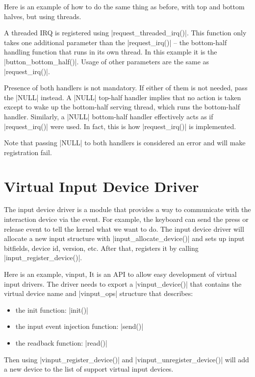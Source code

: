\documentclass[10pt, oneside]{book}
\begin{document}
Here is an example of how to do the same thing as before, with top and bottom halves, but using threads.


A threaded IRQ is registered using \cpp|request_threaded_irq()|.
This function only takes one additional parameter than the \cpp|request_irq()| -- the bottom-half handling function that runs in its own thread.
In this example it is the \cpp|button_bottom_half()|.
Usage of other parameters are the same as \cpp|request_irq()|.

Presence of both handlers is not mandatory.
If either of them is not needed, pass the \cpp|NULL| instead.
A \cpp|NULL| top-half handler implies that no action is taken except to wake up the bottom-half serving thread, which runs the bottom-half handler.
Similarly, a \cpp|NULL| bottom-half handler effectively acts as if \cpp|request_irq()| were used.
In fact, this is how \cpp|request_irq()| is implemented.

Note that passing \cpp|NULL| to both handlers is considered an error and will make registration fail.

\section{Virtual Input Device Driver}
\label{sec:vinput}
The input device driver is a module that provides a way to communicate with the interaction device via the event.
For example, the keyboard can send the press or release event to tell the kernel what we want to do.
The input device driver will allocate a new input structure with \cpp|input_allocate_device()| and sets up input bitfields, device id, version, etc.
After that, registers it by calling \cpp|input_register_device()|.

Here is an example, vinput,
It is an API to allow easy development of virtual input drivers.
The driver needs to export a \cpp|vinput_device()| that contains the virtual device name and \cpp|vinput_ops| structure that describes:

\begin{itemize}
  \item the init function: \cpp|init()|
  \item the input event injection function: \cpp|send()|
  \item the readback function: \cpp|read()|
\end{itemize}

Then using \cpp|vinput_register_device()| and \cpp|vinput_unregister_device()| will add a new device to the list of support virtual input devices.
\end{document}
